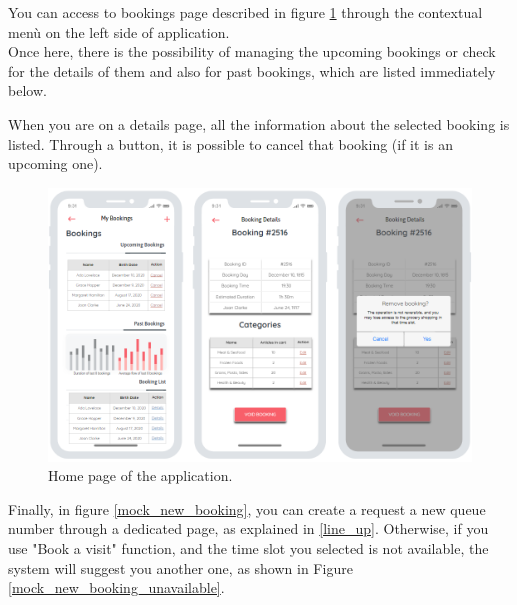 \documentclass[table, 12pt]{article}
\begin{document}
\begin{flushleft}
    You can access to bookings page described in figure \ref{mock_bookings} through the contextual menù on the left side of application.\\
    Once here, there is the possibility of managing the upcoming bookings or check for the details of them and also for past bookings, which are listed immediately below.

    When you are on a details page, all the information about the selected booking is listed. Through a button, it is possible to cancel that booking (if it is an upcoming one).

    \begin{figure}[H]
        \begin{center}
            \includegraphics[width=\textwidth]{assets/mock_bookings.png}
            \caption{Home page of the application.}
            \label{mock_bookings}
        \end{center}
    \end{figure}

    Finally, in figure \ref{mock_new_booking}, you can create a request a new queue number through a dedicated page, as explained in \ref{line_up}.
    Otherwise, if you use "Book a visit" function, and the time slot you selected is not available, the system will suggest you another one, as shown in Figure \ref{mock_new_booking_unavailable}.


\end{flushleft}
\end{document}
